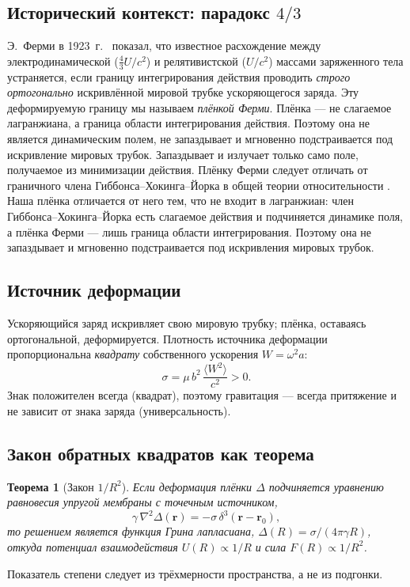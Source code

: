 \documentclass[12pt,a4paper]{article}
\newtheorem{theorem}{Теорема}
\begin{document}
\subsection{Исторический контекст: парадокс $4/3$}
Э.~Ферми в 1923~г.\ \cite{fermi1923} показал, что известное расхождение между
электродинамической ($\tfrac{4}{3}U/c^2$) и релятивистской ($U/c^2$) массами
заряженного тела устраняется, если границу интегрирования действия проводить
\emph{строго ортогонально} искривлённой мировой трубке ускоряющегося заряда.
Эту деформируемую границу мы называем \emph{плёнкой Ферми}. Плёнка ---
не слагаемое лагранжиана, а граница области интегрирования действия. Поэтому
она не является динамическим полем, не запаздывает и мгновенно подстраивается
под искривление мировых трубок. Запаздывает и излучает только само поле,
получаемое из минимизации действия. Плёнку Ферми следует отличать от граничного члена Гиббонса--Хокинга--Йорка в
общей теории относительности \cite{hehl1995}. Наша плёнка отличается от него тем,
что не входит в лагранжиан: член Гиббонса--Хокинга--Йорка есть слагаемое
действия и подчиняется динамике поля, а плёнка Ферми --- лишь граница области
интегрирования. Поэтому она не запаздывает и мгновенно подстраивается под
искривления мировых трубок.

\subsection{Источник деформации}
Ускоряющийся заряд искривляет свою мировую трубку; плёнка, оставаясь
ортогональной, деформируется. Плотность источника деформации пропорциональна
\emph{квадрату} собственного ускорения $W=\omega^2 a$:
\begin{equation}
\sigma = \mu\, b^2\,\frac{\langle W^2\rangle}{c^2} > 0 .
\end{equation}
Знак положителен всегда (квадрат), поэтому гравитация --- всегда притяжение и
не зависит от знака заряда (универсальность).

\subsection{Закон обратных квадратов как теорема}
\begin{theorem}[Закон $1/R^2$]
Если деформация плёнки $\Delta$ подчиняется уравнению равновесия упругой
мембраны с точечным источником,
\begin{equation}
\gamma\,\nabla^2\Delta(\mathbf r) = -\sigma\,\delta^3(\mathbf r-\mathbf r_0),
\end{equation}
то решением является функция Грина лапласиана, $\Delta(R)=\sigma/(4\pi\gamma R)$,
откуда потенциал взаимодействия $U(R)\propto 1/R$ и сила $F(R)\propto 1/R^2$.
\end{theorem}
Показатель степени следует из трёхмерности пространства, а не из подгонки.
\end{document}
